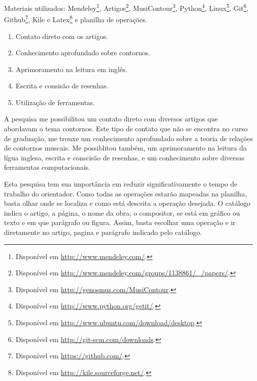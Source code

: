 \documentclass[11pt]{article}
\begin{document}
Materiais utilizados: Mendeley\footnote{Disponível em
  \url{http://www.mendeley.com/}.}, Artigos\footnote{Disponível em
  \url{http://www.mendeley.com/groups/1138861/_/papers/}.},
  MusiContour\footnote{Disponível em \url{http://genosmus.com/MusiContour}.},
  Python\footnote{Disponível em  \url{http://www.python.org/getit/}.},
  Linux\footnote{Disponível em
  \url{http://www.ubuntu.com/download/desktop}.},
  Git\footnote{Disponível em
  \url{http://git-scm.com/downloads}.}, Github\footnote{Disponível em
  \url{https://github.com/}.}, Kile e Latex\footnote{Disponível em
  \url{http://kile.sourceforge.net/}.} e planilha de operações.



\label{sec:resultados}



  \begin{enumerate} 
\item Contato direto com os artigos.
\item Conhecimento aprofundado sobre contornos.
\item Aprimoramento na leitura em inglês.
\item Escrita e consisão de resenhas.
\item Utilização de ferramentas.
\end{enumerate}

A pesquisa me possibilitou um contato direto com diversos artigos que abordavam
o tema contornos. Este tipo de contato que não se encontra no curso de graduação, 
me trouxe um conhecimento aprofundado sobre a teoria de relações de contornos muscais. 
Me possiblitou também, um aprimoramento na leitura da lígua inglesa, escrita e conscisão 
de resenhas, e um conhecimento sobre diversas ferramentas computacionais.



\label{sec:discussao}



Esta pesquisa tem sua importância em reduzir significativamente o
tempo de trabalho do orientador. Como todas as operações estarão mapeadas
na planilha, basta olhar onde se localiza e como está descrita a operação
desejada. O catálogo indica o artigo, a página, o nome da obra, o compositor,
se está em gráfico ou texto e em que parágrafo ou figura. Assim, basta escolhar 
uma operação e ir diretamente no artigo, pagina e parágrafo indicado pelo
catálogo.
\end{document}
